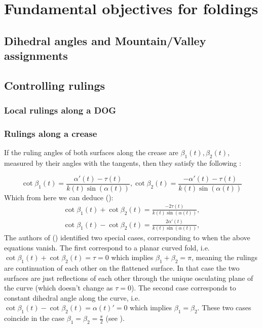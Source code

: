 \section{Fundamental objectives for foldings} \label{sec:objectives}

\subsection{Dihedral angles and Mountain/Valley assignments} \label{sec:rulings}

\subsection{Controlling rulings} \label{sec:rulings}

\subsubsection{Local rulings along a DOG} \label{sec:dog_rulings}
\subsubsection{Rulings along a crease} \label{sec:rulings_crease}
If the ruling angles of both surfaces along the crease are $\beta_1(t),\beta_2(t)$, measured by their angles with the tangents, then they satisfy the following \cite{more_on_paper,duncan_folded}:

\begin{equation}
\cot\beta_1(t) = \frac{\alpha'(t)-\tau(t)}{k(t)\sin(\alpha(t))},\cot\beta_2(t) = \frac{-\alpha'(t)-\tau(t)}{k(t)\sin(\alpha(t))}
\end{equation}
Which from here we can deduce (\cite{mathematical_omnibus,duncan_folded}):
\begin{equation} \label{cot_eq}
\begin{split}
\cot\beta_1(t) + \cot\beta_2(t) = \frac{-2\tau(t)}{k(t)\sin(\alpha(t))},\\
\cot\beta_1(t) - \cot\beta_2(t) = \frac{2\alpha'(t)}{k(t)\sin(\alpha(t))},
\end{split}	
\end{equation}
The authors of (\cite{mathematical_omnibus,duncan_folded}) identified two special cases, corresponding to when the above equations vanish. The first correspond to a planar curved fold, i.e. $\cot\beta_1(t) + \cot\beta_2(t) = \tau = 0$ which implies $\beta_1+\beta_2 = \pi$, meaning the rulings are continuation of each other on the flattened surface. In that case the two surfaces are just reflections of each other through the unique osculating plane of the curve (which doesn't change as $\tau = 0$). The second case corresponds to constant dihedral angle along the curve, i.e. $\cot\beta_1(t) - \cot\beta_2(t) = \alpha(t)' = 0$ which implies $\beta_1 = \beta_2$. These two cases coincide in the case $\beta_1 = \beta_2 = \frac{\pi}{2}$ (see ).


